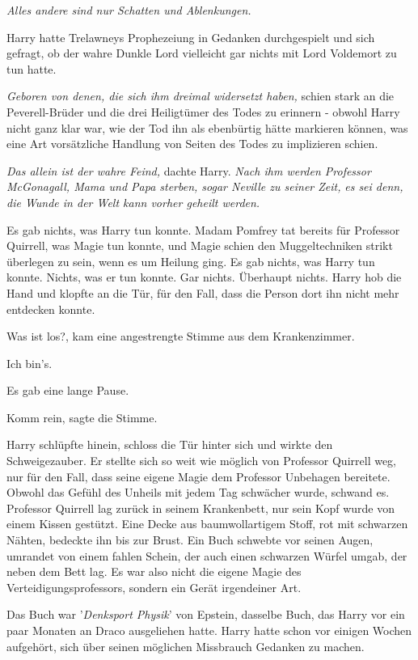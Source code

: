 \emph{Alles andere sind nur Schatten und Ablenkungen.}

Harry hatte Trelawneys Prophezeiung in Gedanken durchgespielt und sich gefragt,
ob der wahre Dunkle Lord vielleicht gar nichts mit Lord Voldemort zu tun hatte.

\emph{Geboren von denen, die sich ihm dreimal widersetzt haben,} schien stark an
die Peverell-Brüder und die drei Heiligtümer des Todes zu erinnern - obwohl
Harry nicht ganz klar war, wie der Tod ihn als ebenbürtig hätte markieren
können, was eine Art vorsätzliche Handlung von Seiten des Todes zu implizieren
schien.

\emph{Das allein ist der wahre Feind,} dachte Harry. \emph{Nach ihm werden
Professor McGonagall, Mama und Papa sterben, sogar Neville zu seiner Zeit,}
\emph{es sei denn, die Wunde in der Welt kann vorher geheilt werden.}

Es gab nichts, was Harry tun konnte. Madam Pomfrey tat bereits für Professor
Quirrell, was Magie tun konnte, und Magie schien den Muggeltechniken strikt
überlegen zu sein, wenn es um Heilung ging. Es gab nichts, was Harry tun konnte.
Nichts, was er tun konnte. Gar nichts. Überhaupt nichts. Harry hob die Hand und
klopfte an die Tür, für den Fall, dass die Person dort ihn nicht mehr entdecken
konnte.

\glqq{}Was ist los?\grqq{}, kam eine angestrengte Stimme aus dem Krankenzimmer.

\glqq{}Ich bin's.\grqq{}

Es gab eine lange Pause.

\glqq{}Komm rein\grqq{}, sagte die Stimme.

Harry schlüpfte hinein, schloss die Tür hinter sich und wirkte den
Schweigezauber. Er stellte sich so weit wie möglich von Professor Quirrell weg,
nur für den Fall, dass seine eigene Magie dem Professor Unbehagen bereitete.
Obwohl das Gefühl des Unheils mit jedem Tag schwächer wurde, schwand es.
Professor Quirrell lag zurück in seinem Krankenbett, nur sein Kopf wurde von
einem Kissen gestützt. Eine Decke aus baumwollartigem Stoff, rot mit schwarzen
Nähten, bedeckte ihn bis zur Brust. Ein Buch schwebte vor seinen Augen, umrandet
von einem fahlen Schein, der auch einen schwarzen Würfel umgab, der neben dem
Bett lag. Es war also nicht die eigene Magie des Verteidigungsprofessors,
sondern ein Gerät irgendeiner Art.

Das Buch war '\emph{Denksport Physik}' von Epstein, dasselbe Buch, das Harry vor
ein paar Monaten an Draco ausgeliehen hatte. Harry hatte schon vor einigen
Wochen aufgehört, sich über seinen möglichen Missbrauch Gedanken zu machen.

